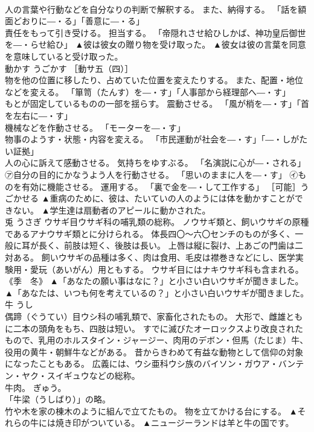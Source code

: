\documentclass[8pt]{extreport}
\begin{document}
\begin{CJK}{UTF8}{min}
\\	人の言葉や行動などを自分なりの判断で解釈する。 また、納得する。 「話を額面どおりに―・る」「善意に―・る」 
\\	責任をもって引き受ける。 担当する。 「帝隠れさせ給ひしかば、神功皇后御世を―・らせ給ひ」	▲彼は彼女の贈り物を受け取った。 ▲彼女は彼の言葉を同意を意味していると受け取った。
\\	動かす	うごかす	［動サ五（四）］ 
\\	物を他の位置に移したり、占めていた位置を変えたりする。 また、配置・地位などを変える。 「箪笥（たんす）を―・す」「人事部から経理部へ―・す」 
\\	もとが固定しているものの一部を揺らす。 震動させる。 「風が梢を―・す」「首を左右に―・す」 
\\	機械などを作動させる。 「モーターを―・す」 
\\	物事のようす・状態・内容を変える。 「市民運動が社会を―・す」「―・しがたい証拠」 
\\	人の心に訴えて感動させる。 気持ちをゆすぶる。 「名演説に心が―・される」 
\\	㋐自分の目的にかなうよう人を行動させる。 「思いのままに人を―・す」 ㋑ものを有効に機能させる。 運用する。 「裏で金を―・して工作する」 ［可能］うごかせる	▲重病のために、彼は、たいていの人のようには体を動かすことができない。 ▲学生達は扇動者のアピールに動かされた。
\\	兎	うさぎ	ウサギ目ウサギ科の哺乳類の総称。 ノウサギ類と、飼いウサギの原種であるアナウサギ類とに分けられる。 体長四〇〜六〇センチのものが多く、一般に耳が長く、前肢は短く、後肢は長い。 上唇は縦に裂け、上あごの門歯は二対ある。 飼いウサギの品種は多く、肉は食用、毛皮は襟巻きなどにし、医学実験用・愛玩（あいがん）用ともする。 ウサギ目にはナキウサギ科も含まれる。 《季　冬》	▲「あなたの願い事はなに？」と小さい白いウサギが聞きました。 ▲「あなたは、いつも何を考えているの？」と小さい白いウサギが聞きました。
\\	牛	うし	
\\	偶蹄（ぐうてい）目ウシ科の哺乳類で、家畜化されたもの。 大形で、雌雄ともに二本の頭角をもち、四肢は短い。 すでに滅びたオーロックスより改良されたもので、乳用のホルスタイン・ジャージー、肉用のデボン・但馬（たじま）牛、役用の黄牛・朝鮮牛などがある。 昔からきわめて有益な動物として信仰の対象になったこともある。 広義には、ウシ亜科ウシ族のバイソン・ガウア・バンテン・ヤク・スイギュウなどの総称。 
\\	牛肉。 ぎゅう。 
\\	「牛梁（うしばり）」の略。 
\\	竹や木を家の棟木のように組んで立てたもの。 物を立てかける台にする。	▲それらの牛には焼き印がついている。 ▲ニュージーランドは羊と牛の国です。

\end{CJK}
\end{document}
